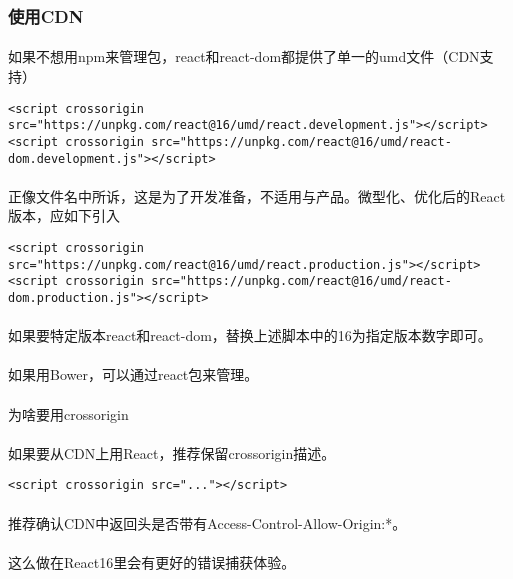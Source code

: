 \documentclass{book}
\begin{document}
\begin{CJK*}{UTF8}{gbsn}
\subsubsection{使用CDN}
\paragraph{}如果不想用npm来管理包，react和react-dom都提供了单一的umd文件（CDN支持）
\begin{verbatim}
<script crossorigin src="https://unpkg.com/react@16/umd/react.development.js"></script>
<script crossorigin src="https://unpkg.com/react@16/umd/react-dom.development.js"></script>
\end{verbatim}
\paragraph{}正像文件名中所诉，这是为了开发准备，不适用与产品。微型化、优化后的React版本，应如下引入
\begin{verbatim}
<script crossorigin src="https://unpkg.com/react@16/umd/react.production.js"></script>
<script crossorigin src="https://unpkg.com/react@16/umd/react-dom.production.js"></script>
\end{verbatim}
\paragraph{}如果要特定版本react和react-dom，替换上述脚本中的16为指定版本数字即可。
\paragraph{}如果用Bower，可以通过react包来管理。
\paragraph{}为啥要用crossorigin
\paragraph{}如果要从CDN上用React，推荐保留crossorigin描述。
\begin{verbatim}
<script crossorigin src="..."></script>
\end{verbatim}
\paragraph{}推荐确认CDN中返回头是否带有Access-Control-Allow-Origin:*。
\paragraph{}这么做在React16里会有更好的错误捕获体验。

\end{CJK*}
\end{document}
